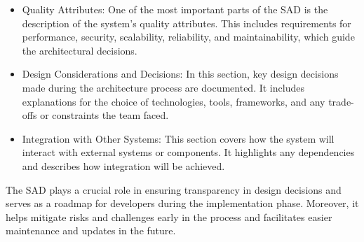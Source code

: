 \documentclass[a4paper, 10pt]{book}
\begin{document}
\begin{itemize}
                \item {\bold Quality Attributes:} One of the most important parts of the SAD is the description of the system's quality attributes. This includes requirements for performance, security, scalability, reliability, and maintainability, which guide the architectural decisions.

                \item {\bold Design Considerations and Decisions:} In this section, key design decisions made during the architecture process are documented. It includes explanations for the choice of technologies, tools, frameworks, and any trade-offs or constraints the team faced.

                \item {\bold Integration with Other Systems:} This section covers how the system will interact with external systems or components. It highlights any dependencies and describes how integration will be achieved.

            \end{itemize}

            The SAD plays a crucial role in ensuring transparency in design decisions and serves as a roadmap for developers during the implementation phase. Moreover, it helps mitigate risks and challenges early in the process and facilitates easier maintenance and updates in the future.
\end{document}
